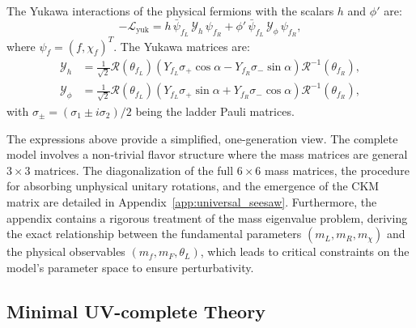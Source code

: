 The Yukawa interactions of the physical fermions with the scalars $h$ and $\phi'$ are:
\begin{equation}
    -\mathcal{L}_{\text{yuk}} = h \, \bar{\psi}_{f_L} \, \mathcal{Y}_{h} \, \psi_{f_R} + \phi' \, \bar{\psi}_{f_L} \, \mathcal{Y}_{\phi} \, \psi_{f_R},
\end{equation}
where $\psi_f = (f, \chi_f)^T$. The Yukawa matrices are:
\begin{align}
    \mathcal{Y}_{h} &= \frac{1}{\sqrt{2}} \mathcal{R}(\theta_{f_L}) \left( Y_{f_L} \sigma_+ \cos\alpha - Y_{f_R} \sigma_- \sin\alpha \right) \mathcal{R}^{-1}(\theta_{f_R}), \label{eq:YukawaL} \\
    \mathcal{Y}_{\phi} &= \frac{1}{\sqrt{2}} \mathcal{R}(\theta_{f_L}) \left( Y_{f_L} \sigma_+ \sin\alpha + Y_{f_R} \sigma_- \cos\alpha \right) \mathcal{R}^{-1}(\theta_{f_R}), \label{eq:YukawaR}
\end{align}
with $\sigma_{\pm} = (\sigma_1 \pm i \sigma_2)/2$ being the ladder Pauli matrices.

The expressions above provide a simplified, one-generation view. The complete model involves a non-trivial flavor structure where the mass matrices are general $3 \times 3$ matrices. The diagonalization of the full $6 \times 6$ mass matrices, the procedure for absorbing unphysical unitary rotations, and the emergence of the CKM matrix are detailed in Appendix~\ref{app:universal_seesaw}. Furthermore, the appendix contains a rigorous treatment of the mass eigenvalue problem, deriving the exact relationship between the fundamental parameters $(m_L, m_R, m_\chi)$ and the physical observables $(m_f, m_F, \theta_L)$, which leads to critical constraints on the model's parameter space to ensure perturbativity.



\subsection{Minimal UV-complete Theory}

